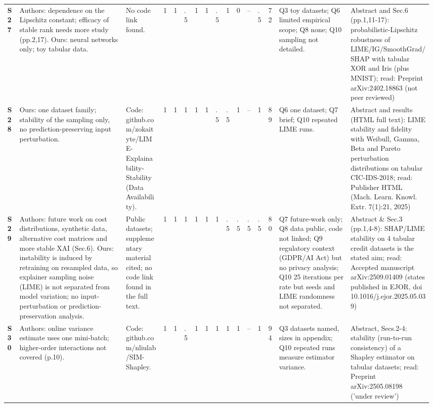 \begin{longtable}{@{}P{1.0cm}P{4.6cm}P{3.6cm}P{0.3cm}P{0.3cm}P{0.3cm}P{0.3cm}P{0.3cm}P{0.3cm}P{0.3cm}P{0.3cm}P{0.3cm}P{0.36cm}P{0.75cm}P{3.0cm}P{3.9cm}@{}}
\textbf{S27} & Authors: dependence on the Lipschitz constant; efficacy of stable rank needs more study (pp.2,17). Ours: neural networks only; toy tabular data. & No code link found. & 1 & 1 & .5 & 1 & 1 & .5 & 1 & 0 & -- & .5 & 72 & Q3 toy datasets; Q6 limited empirical scope; Q8 none; Q10 sampling not detailed. & Abstract and Sec.6 (pp.1,11-17): probabilistic-Lipschitz robustness of LIME/\allowbreak{}IG/\allowbreak{}SmoothGrad/\allowbreak{}SHAP with tabular XOR and Iris (plus MNIST); read: Preprint arXiv:2402.18863 (not peer reviewed) \\
\textbf{S28} & Ours: one dataset family; stability of the sampling only, no prediction-preserving input perturbation. & Code: github.com/\allowbreak{}zokaityte/\allowbreak{}LIME-Explainability-Stability (Data Availability). & 1 & 1 & 1 & 1 & 1 & .5 & .5 & 1 & -- & 1 & 89 & Q6 one dataset; Q7 brief; Q10 repeated LIME runs. & Abstract and results (HTML full text): LIME stability and fidelity with Weibull, Gamma, Beta and Pareto perturbation distributions on tabular CIC-IDS-2018; read: Publisher HTML (Mach. Learn. Knowl. Extr. 7(1):21, 2025) \\
\textbf{S29} & Authors: future work on cost distributions, synthetic data, alternative cost matrices and more stable XAI (Sec.6). Ours: instability is induced by retraining on resampled data, so explainer sampling noise (LIME) is not separated from model variation; no input-perturbation or prediction-preservation analysis. & Public datasets; supplementary material cited; no code link found in the full text. & 1 & 1 & 1 & 1 & 1 & 1 & .5 & .5 & .5 & .5 & 80 & Q7 future-work only; Q8 data public, code not linked; Q9 regulatory context (GDPR/\allowbreak{}AI Act) but no privacy analysis; Q10 25 iterations per rate but seeds and LIME randomness not separated. & Abstract \& Sec.3 (pp.1,4-8): SHAP/\allowbreak{}LIME stability on 4 tabular credit datasets is the stated aim; read: Accepted manuscript arXiv:2509.01409 (states published in EJOR, doi 10.1016/\allowbreak{}j.ejor.2025.05.039) \\
\textbf{S30} & Authors: online variance estimate uses one mini-batch; higher-order interactions not covered (p.10). & Code: github.com/\allowbreak{}nliulab/\allowbreak{}SIM-Shapley. & 1 & 1 & .5 & 1 & 1 & 1 & 1 & 1 & -- & 1 & 94 & Q3 datasets named, sizes in appendix; Q10 repeated runs measure estimator variance. & Abstract, Secs.2-4: stability (run-to-run consistency) of a Shapley estimator on tabular datasets; read: Preprint arXiv:2505.08198 ('under review') \\

\end{longtable}
